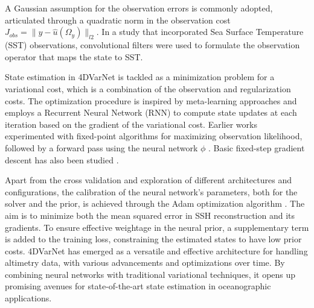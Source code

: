 \begin{bibunit}
A Gaussian assumption for the observation errors is commonly adopted, articulated through a quadratic norm in the observation cost $J_{obs}= \|y - \hat{u}(\Omega_y)\|_{l2}$. In a study that incorporated Sea Surface Temperature (SST) observations\cite{}, convolutional filters were used to formulate the observation operator that maps the state to SST.


State estimation in 4DVarNet is tackled as a minimization problem for a variational cost, which is a combination of the observation and regularization costs. The optimization procedure is inspired by meta-learning approaches and employs a Recurrent Neural Network (RNN) to compute state updates at each iteration based on the gradient of the variational cost. Earlier works experimented with fixed-point algorithms for maximizing observation likelihood, followed by a forward pass using the neural network $\phi$ \cite{}. Basic fixed-step gradient descent has also been studied \cite{}.

Apart from the cross validation and exploration of different architectures and configurations, the calibration of the neural network's parameters, both for the solver and the prior, is achieved through the Adam optimization algorithm \cite{}. The aim is to minimize both the mean squared error in SSH reconstruction and its gradients. To ensure effective weightage in the neural prior, a supplementary term is added to the training loss, constraining the estimated states to have low prior costs.
4DVarNet has emerged as a versatile and effective architecture for handling altimetry data, with various advancements and optimizations over time. By combining neural networks with traditional variational techniques, it opens up promising avenues for state-of-the-art state estimation in oceanographic applications.


\end{bibunit}

